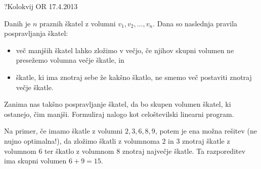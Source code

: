 \begin{naloga}{?}{Kolokvij OR 17.4.2013}
\begin{vprasanje}[skatle]
Danih je $n$ praznih škatel z volumni $v_1, v_2, \dots, v_n$.
Dana so naslednja pravila pospravljanja škatel:
\begin{itemize}
\item več manjših škatel lahko zložimo v večjo,
če njihov skupni volumen ne presežemo volumna večje škatle, in
\item škatle, ki ima znotraj sebe že kakšno škatlo,
ne smemo več postaviti znotraj večje škatle.
\end{itemize}
Zanima nas takšno pospravljanje škatel,
da bo skupen volumen škatel, ki ostanejo, čim manjši.
Formuliraj nalogo kot celoštevilski linearni program.

Na primer, če imamo škatle z volumni $2, 3, 6, 8, 9$,
potem je ena možna rešitev (ne nujno optimalna!),
da zložimo škatli z volumnoma $2$ in $3$ znotraj škatle z volumnom $6$
ter škatlo z volumnom $8$ znotraj največje škatle.
Ta razporeditev ima skupni volumen $6 + 9 = 15$.
\end{vprasanje}
\begin{odgovor}
\end{odgovor}
\end{naloga}


